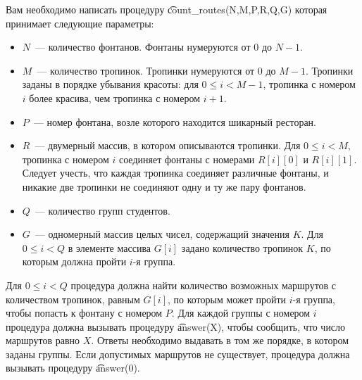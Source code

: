Вам необходимо написать процедуру \t{count\_routes(N,M,P,R,Q,G)} которая принимает следующие параметры: 
\begin{itemize}
\item $N$~--- количество фонтанов. Фонтаны нумеруются от $0$ до $N-1$. 
\item $M$~--- количество тропинок. Тропинки нумеруются от $0$ до $M-1$. Тропинки заданы в порядке убывания красоты: для $0 \le i < M-1$, тропинка с номером $i$ более красива, чем тропинка с номером $i+1$. 
\item $P$~--- номер фонтана, возле которого находится шикарный ресторан. 
\item $R$~--- двумерный массив, в котором описываются тропинки. Для $0 \le i < M$, тропинка с номером $i$ соединяет фонтаны с номерами $R[i][0]$ и $R[i][1]$. Следует учесть, что каждая тропинка соединяет различные фонтаны, и никакие две тропинки не соединяют одну и ту же пару фонтанов. 
\item $Q$~--- количество групп студентов. 
\item $G$~--- одномерный массив целых чисел, содержащий значения $K$. Для $0 \le i < Q$ в элементе массива $G[i]$ задано количество тропинок $K$, по которым должна пройти $i$-я группа.
\end{itemize}

Для $0 \le i < Q$ процедура должна найти количество возможных маршрутов с количеством тропинок, равным $G[i]$, по которым может пройти $i$-я группа, чтобы попасть к фонтану с номером $P$. Для каждой группы с номером $i$ процедура должна вызывать процедуру \t{answer(X)}, чтобы сообщить, что число маршрутов равно $X$. Ответы необходимо выдавать в том же порядке, в котором заданы группы. Если допустимых маршрутов не существует, процедура должна вызывать процедуру \t{answer(0)}.

